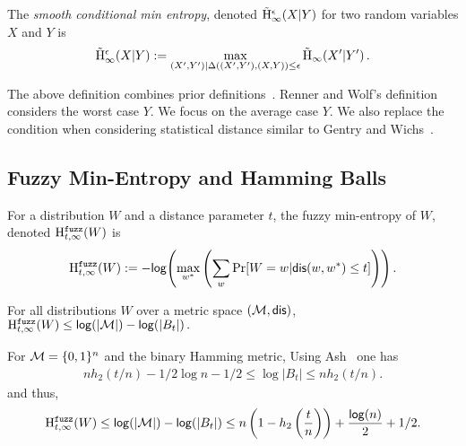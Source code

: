 \begin{definition}
    The \emph{smooth conditional min entropy}, denoted $\tilde{\mathrm{H}}_\infty^\epsilon(X|Y)$ for two random variables $X$ and $Y$ is \[\tilde{\mathrm{H}}_\infty^\epsilon(X|Y):=\max_{(X',Y') | \Delta((X', Y'), (X, Y))\le \epsilon} \tilde{\mathrm{H}}_{\infty}\!\left(X'|Y'\right).
    \] 
\end{definition}

The above definition combines prior definitions~\cite{renner2005simple,dodis2008fuzzy,reyzin2011some,gentry2011separating}.  Renner and Wolf's definition considers the worst case $Y$.  We focus on the average case $Y$. We also replace the condition when considering statistical distance similar to Gentry and Wichs~\cite{gentry2011separating}.






\subsection{Fuzzy Min-Entropy and Hamming Balls}
\begin{definition}

For a distribution $W$ and a distance parameter $t$, the fuzzy min-entropy of $W$, denoted $\mathrm{H}^{\mathtt{fuzz}}_{t,\infty}(W)$ is 
\[
\mathrm{H}^{\mathtt{fuzz}}_{t,\infty}(W):= -\mathsf{log}\!\left( \max_{w^*} \left(\sum_{w} \Pr[W=w|\mathsf{dis}(w, w^*)\le t] \right)\right).
\]
\end{definition}

\begin{proposition} \label{prop:max fuzz ent}
For all distributions $W$ over a metric space $(\mathcal{M}, \mathsf{dis})$, 
$\mathrm{H}^{\mathtt{fuzz}}_{t,\infty}(W) \le \mathsf{log}\!\left(|\mathcal{M}|\right) - \mathsf{log}\!\left(|B_t|\right).
$
\end{proposition}
\noindent
For $\mathcal{M} = \{0, 1\}^n$ and the binary Hamming metric,
Using Ash~\cite[Lemma 4.7.2, Equation 4.7.5, p. 115]{ash2012information} one has
\begin{align} nh_2(t/n)  -1/2\log{n} - 1/2 \le \log{|B_t|} \le  nh_2(t/n)\label{eq:size of balls}.\end{align}
and thus, 
\[
\mathrm{H}^{\mathtt{fuzz}}_{t,\infty}(W) \le \mathsf{log}\!\left(|\mathcal{M}|\right) - \mathsf{log}\!\left(|B_t|\right)\le n\left(1-h_2\left(\frac{t}{n}\right)\right)+ \frac{\mathsf{log}\!\left(n\right)}{2} +1/2.
\]

